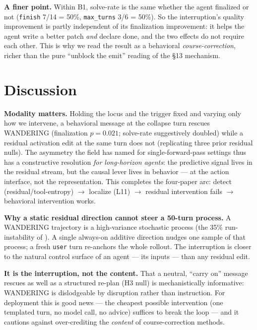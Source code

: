 \documentclass[11pt]{article}
\begin{document}
\textbf{A finer point.} Within B1, solve-rate is the same whether the agent finalized or not (\texttt{finish} 7/14 = 50\%, \texttt{max\_turns} 3/6 = 50\%). So the interruption's quality improvement is partly independent of its finalization improvement: it helps the agent write a better patch \emph{and} declare done, and the two effects do not require each other. This is why we read the result as a behavioral \emph{course-correction}, richer than the pure ``unblock the emit'' reading of the \S13 mechanism.

\section{Discussion}\label{sec:discussion}

\textbf{Modality matters.} Holding the locus and the trigger fixed and varying only how we intervene, a behavioral message at the collapse turn rescues WANDERING (finalization $p=0.021$; solve-rate suggestively doubled) while a residual activation edit at the same turn does not (replicating three prior residual nulls). The asymmetry the field has named for single-forward-pass settings \cite{basu_kag,bhalla_pc} thus has a constructive resolution \emph{for long-horizon agents}: the predictive signal lives in the residual stream, but the causal lever lives in behavior --- at the action interface, not the representation. This completes the four-paper arc: detect (residual/tool-entropy) $\to$ localize (L11) $\to$ residual intervention fails $\to$ behavioral intervention works.

\textbf{Why a static residual direction cannot steer a 50-turn process.} A WANDERING trajectory is a high-variance stochastic process (the 35\% run-instability of \cite{residual_nulls}). A single always-on additive direction nudges one sample of that process; a fresh \texttt{user} turn re-anchors the whole rollout. The interruption is closer to the natural control surface of an agent --- its inputs --- than any residual edit.

\textbf{It is the interruption, not the content.} That a neutral, ``carry on'' message rescues as well as a structured re-plan (H3 null) is mechanistically informative: WANDERING is dislodgeable by disruption rather than instruction. For deployment this is good news --- the cheapest possible intervention (one templated turn, no model call, no advice) suffices to break the loop --- and it cautions against over-crediting the \emph{content} of course-correction methods.
\end{document}
